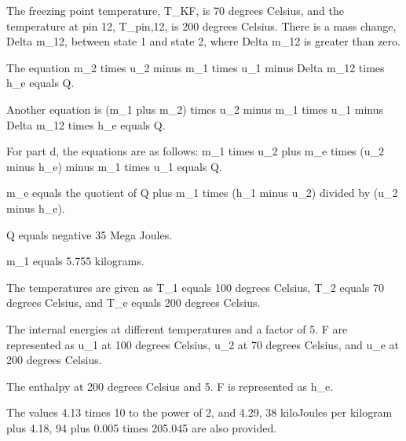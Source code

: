 The freezing point temperature, T_KF, is 70 degrees Celsius, and the temperature at pin 12, T_pin,12, is 200 degrees Celsius. There is a mass change, Delta m_12, between state 1 and state 2, where Delta m_12 is greater than zero.

The equation m_2 times u_2 minus m_1 times u_1 minus Delta m_12 times h_e equals Q.

Another equation is (m_1 plus m_2) times u_2 minus m_1 times u_1 minus Delta m_12 times h_e equals Q.

For part d, the equations are as follows:
m_1 times u_2 plus m_e times (u_2 minus h_e) minus m_1 times u_1 equals Q.

m_e equals the quotient of Q plus m_1 times (h_1 minus u_2) divided by (u_2 minus h_e).

Q equals negative 35 Mega Joules.

m_1 equals 5.755 kilograms.

The temperatures are given as T_1 equals 100 degrees Celsius, T_2 equals 70 degrees Celsius, and T_e equals 200 degrees Celsius.

The internal energies at different temperatures and a factor of 5. F are represented as u_1 at 100 degrees Celsius, u_2 at 70 degrees Celsius, and u_e at 200 degrees Celsius.

The enthalpy at 200 degrees Celsius and 5. F is represented as h_e.

The values 4.13 times 10 to the power of 2, and 4.29, 38 kiloJoules per kilogram plus 4.18, 94 plus 0.005 times 205.045 are also provided.